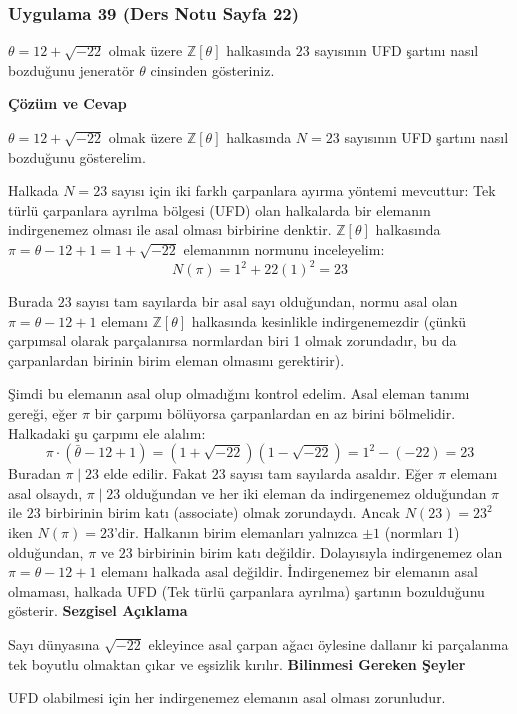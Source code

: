 \documentclass[11pt, a4paper]{article}
\newenvironment{cozum}{
    \vspace{0.5cm}
    \noindent\textcolor{green!60!black}{\faCheckCircle\enspace \textbf{\Large Çözüm ve Cevap}}\par\vspace{0.2cm}
}{}
\newenvironment{sezgisel}{
    \vspace{0.5cm}
    \noindent\textcolor{orange!80!black}{\faLightbulb\enspace \textbf{\Large Sezgisel Açıklama}}\par\vspace{0.2cm}
    \itshape
}{}
\newenvironment{bilgi}{
    \vspace{0.5cm}
    \noindent\textcolor{red!70!black}{\faExclamationTriangle\enspace \textbf{\Large Bilinmesi Gereken Şeyler}}\par\vspace{0.2cm}
}{}
\begin{document}
\subsubsection{Uygulama 39 (Ders Notu Sayfa 22)}
\begin{sorubox}
$\theta = 12 + \sqrt{-22}$ olmak üzere $\mathbb{Z}[\theta]$ halkasında $23$ sayısının UFD şartını nasıl bozduğunu jeneratör $\theta$ cinsinden gösteriniz.
\end{sorubox}
\begin{cozum}
$\theta = 12 + \sqrt{-22}$ olmak üzere $\mathbb{Z}[\theta]$ halkasında $N = 23$ sayısının UFD şartını nasıl bozduğunu gösterelim.

Halkada $N = 23$ sayısı için iki farklı çarpanlara ayırma yöntemi mevcuttur:
Tek türlü çarpanlara ayrılma bölgesi (UFD) olan halkalarda bir elemanın indirgenemez olması ile asal olması birbirine denktir. $\mathbb{Z}[\theta]$ halkasında $\pi = \theta - 12 + 1 = 1+\sqrt{-22}$ elemanının normunu inceleyelim:
\[ N(\pi) = 1^2 + 22(1)^2 = 23 \]

Burada $23$ sayısı tam sayılarda bir asal sayı olduğundan, normu asal olan $\pi = \theta - 12 + 1$ elemanı $\mathbb{Z}[\theta]$ halkasında kesinlikle indirgenemezdir (çünkü çarpımsal olarak parçalanırsa normlardan biri 1 olmak zorundadır, bu da çarpanlardan birinin birim eleman olmasını gerektirir).

Şimdi bu elemanın asal olup olmadığını kontrol edelim. Asal eleman tanımı gereği, eğer $\pi$ bir çarpımı bölüyorsa çarpanlardan en az birini bölmelidir. Halkadaki şu çarpımı ele alalım:
\[ \pi \cdot (\bar{\theta} - 12 + 1) = (1+\sqrt{-22})(1-\sqrt{-22}) = 1^2 - (-22) = 23 \]
Buradan $\pi \mid 23$ elde edilir. Fakat $23$ sayısı tam sayılarda asaldır. Eğer $\pi$ elemanı asal olsaydı, $\pi \mid 23$ olduğundan ve her iki eleman da indirgenemez olduğundan $\pi$ ile $23$ birbirinin birim katı (associate) olmak zorundaydı. Ancak $N(23) = 23^2$ iken $N(\pi) = 23$'dir. Halkanın birim elemanları yalnızca $\pm 1$ (normları 1) olduğundan, $\pi$ ve $23$ birbirinin birim katı değildir. Dolayısıyla indirgenemez olan $\pi = \theta - 12 + 1$ elemanı halkada asal değildir. İndirgenemez bir elemanın asal olmaması, halkada UFD (Tek türlü çarpanlara ayrılma) şartının bozulduğunu gösterir.
\end{cozum}
\begin{sezgisel}
Sayı dünyasına $\sqrt{-22}$ ekleyince asal çarpan ağacı öylesine dallanır ki parçalanma tek boyutlu olmaktan çıkar ve eşsizlik kırılır.
\end{sezgisel}
\begin{bilgi}
UFD olabilmesi için her indirgenemez elemanın asal olması zorunludur.
\end{bilgi}
\end{document}
